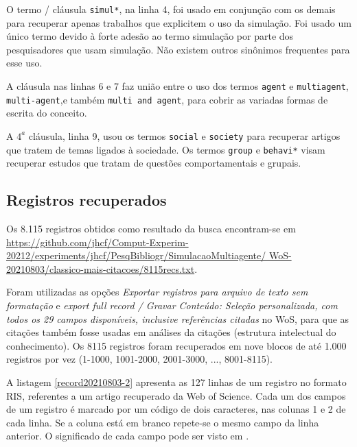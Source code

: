 O termo / cláusula  \texttt{simul*}, na linha 4, foi usado em conjunção com os demais para recuperar apenas trabalhos que explicitem o uso da simulação.
Foi usado um único termo devido à forte adesão ao termo simulação por parte dos pesquisadores que usam simulação. Não existem outros sinônimos frequentes para esse uso.

A cláusula nas linhas 6 e 7 faz união entre o uso dos termos \texttt{agent} e \texttt{multiagent}, \texttt{multi-agent},e  também \texttt{multi and agent}, para cobrir as variadas formas de escrita do conceito.

A $4^{a}$ cláusula, linha 9,  usou os termos \texttt{social} e \texttt{society} para recuperar artigos que tratem de temas ligados à sociedade.
Os termos \texttt{group} e \texttt{behavi*} visam recuperar estudos que tratam de questões comportamentais e grupais.

\subsection{Registros recuperados}

Os 8.115 registros obtidos como resultado da busca encontram-se em \url{https://github.com/jhcf/Comput-Experim-20212/experiments/jhcf/PesqBibliogr/SimulacaoMultiagente/ WoS-20210803/classico-mais-citacoes/8115recs.txt}. 

Foram utilizadas as opções \textit{Exportar registros para arquivo de texto sem formatação} e \textit{export full record / Gravar Conteúdo: Seleção personalizada, com todos os 29 campos disponíveis, inclusive referências citadas} no WoS, para que as citações também fosse usadas em análises da citações (estrutura intelectual do conhecimento). Os 8115 registros foram recuperados em nove blocos de até 1.000 registros por vez (1-1000, 1001-2000, 2001-3000, ..., 8001-8115).

A listagem \ref{record20210803-2} apresenta as 127 linhas de um registro no formato RIS, referentes a um artigo recuperado da Web of Science. Cada um dos campos de um registro é marcado por um código de dois caracteres, nas colunas 1 e 2 de cada linha. Se a coluna está em branco repete-se o mesmo campo da linha anterior.
O significado de cada campo pode ser visto em \citep{wikipedia_ris_2017}.

